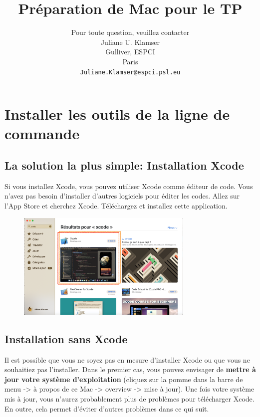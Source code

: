\documentclass{article}
\title{Préparation de Mac pour le TP}
\author{
Pour toute question, veuillez contacter\\
 Juliane U. Klamser\\%
  Gulliver,  ESPCI\\
  Paris \\
  \texttt{Juliane.Klamser@espci.psl.eu} \\
}
\begin{document}
\maketitle

\tableofcontents




\section{Installer les outils de la ligne de commande}
\subsection{La solution la plus simple: Installation Xcode}
Si vous installez Xcode, vous pouvez utiliser Xcode comme éditeur de code. Vous n'avez pas besoin d'installer d'autres logiciels pour éditer les codes.
Allez sur l'App Store et cherchez Xcode. Téléchargez et installez cette application.
\begin{figure}[H]
\center
\includegraphics[width=0.75\textwidth]{Plots/AppStoreXcode.png}
\end{figure}
\subsection{Installation sans Xcode}
Il est possible que vous ne soyez pas en mesure d'installer Xcode ou que vous ne souhaitiez pas l'installer.  Dans le premier cas, vous pouvez envisager de \textbf{mettre à jour votre système d'exploitation} (cliquez sur la pomme dans la barre de menu -> à propos de ce Mac -> overview -> mise à jour). Une fois votre système mis à jour, vous n'aurez probablement plus de problèmes pour télécharger Xcode. En outre, cela permet d'éviter d'autres problèmes dans ce qui suit.
\end{document}
